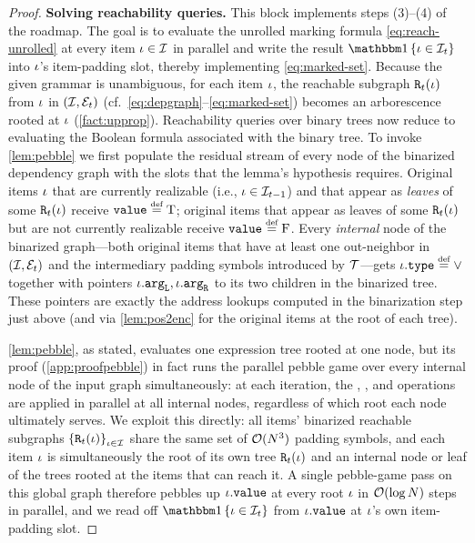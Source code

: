 \documentclass{article}
\begin{document}
\begin{proof}
    \textbf{Solving reachability queries.}
    This block implements steps (3)--(4) of the roadmap. The goal is to evaluate the unrolled marking formula \cref{eq:reach-unrolled} at every item ${{ \iota}} \in {{\mathcal{I}}}$ in parallel and write the result $\ind{\itm \in \items_t}$ into ${{ \iota}}$'s item-padding slot, thereby implementing \cref{eq:marked-set}.
    Because the given grammar is unambiguous, for each item ${{ \iota}}$, the reachable subgraph ${\mathtt{R}}_t({{ \iota}})$ from ${{ \iota}}$ in $({{\mathcal{I}}}, {\mathcal{E}}_t)$ (cf.\ \cref{eq:depgraph}--\cref{eq:marked-set}) becomes an arborescence rooted at ${{ \iota}}$ (\cref{fact:upprop}).
    Reachability queries over binary trees now reduce to evaluating the Boolean formula associated with the binary tree.
    To invoke \cref{lem:pebble} we first populate the residual stream of every node of the binarized dependency graph with the slots that the lemma's hypothesis requires.
    Original items ${{ \iota}}$ that are currently realizable (i.e., ${{ \iota}} \in {{\mathcal{I}}}_{t-1}$) and that appear as \emph{leaves} of some ${\mathtt{R}}_t({{ \iota}})$ receive $\fval \defeq \TRUE$; original items that appear as leaves of some ${\mathtt{R}}_t({{ \iota}})$ but are not currently realizable receive $\fval \defeq \FALSE$.
    Every \emph{internal} node of the binarized graph---both original items that have at least one out-neighbor in $({{\mathcal{I}}}, {\mathcal{E}}_t)$ and the intermediary padding symbols introduced by ${{ \mathcal{T}}}$---gets $\itm.\ftype \defeq \lor$ together with pointers ${{ \iota}}.{\mathtt{arg}_\mathtt{L}}, {{ \iota}}.{\mathtt{arg}_\mathtt{R}}$ to its two children in the binarized tree.
    These pointers are exactly the address lookups computed in the binarization step just above (and via \cref{lem:pos2enc} for the original items at the root of each tree).
    
    \cref{lem:pebble}, as stated, evaluates one expression tree rooted at one node, but its proof (\cref{app:proofpebble}) in fact runs the parallel pebble game over every internal node of the input graph simultaneously: at each iteration, the \activateStep, \squareStep, and \pebbleStep operations are applied in parallel at all internal nodes, regardless of which root each node ultimately serves.
    We exploit this directly: all items' binarized reachable subgraphs ${{\{ {\mathtt{R}}_t({{ \iota}}) \}}}_{{{ \iota}} \in {{\mathcal{I}}}}$ share the same set of ${{ \mathcal{O}}}({{ N}}^3)$ padding symbols, and each item ${{ \iota}}$ is simultaneously the root of its own tree ${\mathtt{R}}_t({{ \iota}})$ and an internal node or leaf of the trees rooted at the items that can reach it.
    A single pebble-game pass on this global graph therefore pebbles up ${{ \iota}}.{\mathtt{value}}$ at every root ${{ \iota}}$ in ${{ \mathcal{O}}}(\log {{ N}})$ steps in parallel, and we read off $\ind{\itm \in \items_t}$ from ${{ \iota}}.{\mathtt{value}}$ at ${{ \iota}}$'s own item-padding slot.
    

\end{proof}
\end{document}
